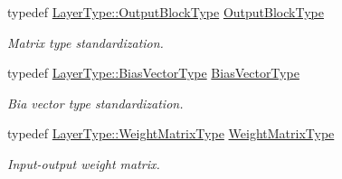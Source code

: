 \begin{DoxyCompactItemize}
typedef \hyperlink{classffnn_1_1layer_1_1_sparsely_connected_aacf4fb49a3f57aba90e55d8d3c63cf45}{Layer\-Type\-::\-Output\-Block\-Type} \hyperlink{classffnn_1_1optimizer_1_1_gradient_descent_3_01layer_1_1_sparsely_connected_3_01_value_type_00_e6c27913ab0d90f52f73031aa88c19bf_a3398102cd38960d104d31c868ecd9c06}{Output\-Block\-Type}
\begin{DoxyCompactList}\small\item\em Matrix type standardization. \end{DoxyCompactList}\item 
typedef \hyperlink{classffnn_1_1layer_1_1_sparsely_connected_ad2d566cbb6c54c8723d79737075b4a00}{Layer\-Type\-::\-Bias\-Vector\-Type} \hyperlink{classffnn_1_1optimizer_1_1_gradient_descent_3_01layer_1_1_sparsely_connected_3_01_value_type_00_e6c27913ab0d90f52f73031aa88c19bf_a83473b9494908577009ea7edf1de1dfd}{Bias\-Vector\-Type}
\begin{DoxyCompactList}\small\item\em Bia vector type standardization. \end{DoxyCompactList}\item 
typedef \hyperlink{classffnn_1_1layer_1_1_sparsely_connected_acafafa368b81042965eed9607cad2dbd}{Layer\-Type\-::\-Weight\-Matrix\-Type} \hyperlink{classffnn_1_1optimizer_1_1_gradient_descent_3_01layer_1_1_sparsely_connected_3_01_value_type_00_e6c27913ab0d90f52f73031aa88c19bf_aac103d3f1c0095e1a195238254271ce1}{Weight\-Matrix\-Type}
\begin{DoxyCompactList}\small\item\em Input-\/output weight matrix. \end{DoxyCompactList}\end{DoxyCompactItemize}
